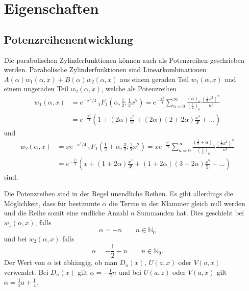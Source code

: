 %
%
%
\section{Eigenschaften
	\label{parzyl:section:Eigenschaften}}

\subsection{Potenzreihenentwicklung
	\label{parzyl:potenz}}
Die parabolischen Zylinderfunktionen können auch als Potenzreihen geschrieben werden.
Parabolische Zylinderfunktionen sind Linearkombinationen 
$A(\alpha)w_1(\alpha, x) + B(\alpha)w_2(\alpha, x)$ aus einem geraden Teil $w_1(\alpha, x)$ 
und einem ungeraden Teil $w_2(\alpha, x)$, welche als Potenzreihen
\begin{align}
	w_1(\alpha,x)
	&=  
	e^{-x^2/4} \,
	{}_{1} F_{1}
	(
	\alpha, {\textstyle \frac{1}{2}} ; {\textstyle \frac{1}{2}}x^2) 
	= 
	e^{-\frac{x^2}{4}}
	\sum^{\infty}_{n=0}
	\frac{\left ( \alpha \right )_{n}}{\left ( \frac{1}{2}\right )_{n}}
	\frac{\left ( \frac{1}{2} x^2\right )^n}{n!} \\
	&=
	e^{-\frac{x^2}{4}}
	\left ( 
	1 
	+
	\left ( 2\alpha \right )\frac{x^2}{2!}
	+
	\left ( 2\alpha \right )\left ( 2 + 2\alpha \right )\frac{x^4}{4!}  
	+
	\dots
	\right )
\end{align}
und
\begin{align}
	w_2(\alpha,x)
	&=  
	xe^{-x^2/4} \,
	{}_{1} F_{1}
	(
	{\textstyle \frac{1}{2}} 
	+ \alpha, {\textstyle \frac{3}{2}} ; {\textstyle \frac{1}{2}}x^2) 
	= 
	xe^{-\frac{x^2}{4}}
	\sum^{\infty}_{n=0}
	\frac{\left ( \frac{1}{2} + \alpha \right )_{n}}{\left ( \frac{3}{2}\right )_{n}}
	\frac{\left ( \frac{1}{2} x^2\right )^n}{n!} \\
	&=
	e^{-\frac{x^2}{4}}
	\left ( 
	x 
	+
	\left ( 1 + 2\alpha \right )\frac{x^3}{3!}
	+
	\left ( 1 + 2\alpha \right )\left ( 3 + 2\alpha \right )\frac{x^5}{5!}  
	+
	\dots
	\right )
\end{align}
sind.


Die Potenzreihen sind in der Regel unendliche Reihen. 
Es gibt allerdings die Möglichkeit, dass für bestimmte $\alpha$ die Terme in der Klammer gleich null werden 
und die Reihe somit eine endliche Anzahl $n$ Summanden hat.
Dies geschieht bei $w_1(\alpha,x)$, falls
\begin{equation}
	\alpha =  -n \qquad n \in \mathbb{N}_0
\end{equation}
und bei $w_2(\alpha,x)$ falls
\begin{equation}
	\alpha = -\frac{1}{2} - n \qquad n \in \mathbb{N}_0.
\end{equation}
Der Wert von $\alpha$ ist abhängig, ob man $D_n(x)$, $U(a,x)$ oder $V(a,x)$ verwendet.
Bei $D_n(x)$ gilt $\alpha = -{\textstyle \frac{1}{2}} n$ und bei $U(a,z)$ oder $V(a,x)$ gilt 
$\alpha = {\textstyle \frac{1}{2}} a + {\textstyle \frac{1}{4}}$.
